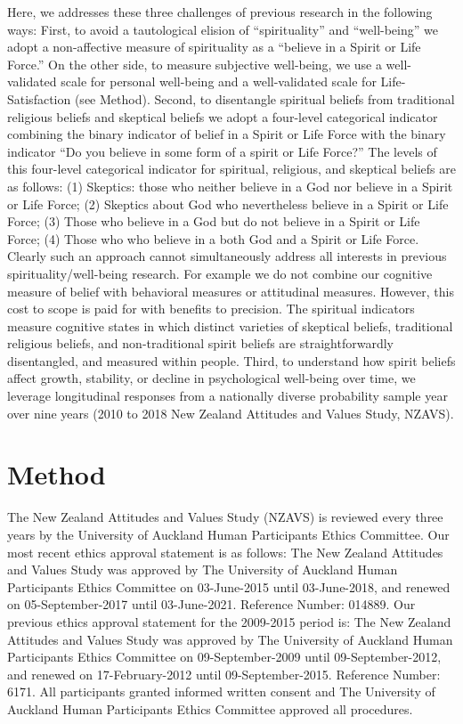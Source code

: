 \documentclass[
  english,
  man,floatsintext]{apa6}
\begin{document}
Here, we addresses these three challenges of previous research in the following ways: First, to avoid a tautological elision of \enquote{spirituality} and \enquote{well-being} we adopt a non-affective measure of spirituality as a \enquote{believe in a Spirit or Life Force.} On the other side, to measure subjective well-being, we use a well-validated scale for personal well-being and a well-validated scale for Life-Satisfaction (see Method). Second, to disentangle spiritual beliefs from traditional religious beliefs and skeptical beliefs we adopt a four-level categorical indicator combining the binary indicator of belief in a Spirit or Life Force with the binary indicator \enquote{Do you believe in some form of a spirit or Life Force?} The levels of this four-level categorical indicator for spiritual, religious, and skeptical beliefs are as follows: (1) Skeptics: those who neither believe in a God nor believe in a Spirit or Life Force; (2) Skeptics about God who nevertheless believe in a Spirit or Life Force; (3) Those who believe in a God but do not believe in a Spirit or Life Force; (4) Those who who believe in a both God and a Spirit or Life Force. Clearly such an approach cannot simultaneously address all interests in previous spirituality/well-being research. For example we do not combine our cognitive measure of belief with behavioral measures or attitudinal measures. However, this cost to scope is paid for with benefits to precision. The spiritual indicators measure cognitive states in which distinct varieties of skeptical beliefs, traditional religious beliefs, and non-traditional spirit beliefs are straightforwardly disentangled, and measured within people. Third, to understand how spirit beliefs affect growth, stability, or decline in psychological well-being over time, we leverage longitudinal responses from a nationally diverse probability sample year over nine years (2010 to 2018 New Zealand Attitudes and Values Study, NZAVS).

\hypertarget{method}{%
\section{Method}\label{method}}

The New Zealand Attitudes and Values Study (NZAVS) is reviewed every three years by the University of Auckland Human Participants Ethics Committee. Our most recent ethics approval statement is as follows: The New Zealand Attitudes and Values Study was approved by The University of Auckland Human Participants Ethics Committee on 03-June-2015 until 03-June-2018, and renewed on 05-September-2017 until 03-June-2021. Reference Number: 014889. Our previous ethics approval statement for the 2009-2015 period is: The New Zealand Attitudes and Values Study was approved by The University of Auckland Human Participants Ethics Committee on 09-September-2009 until 09-September-2012, and renewed on 17-February-2012 until 09-September-2015. Reference Number: 6171. All participants granted informed written consent and The University of Auckland Human Participants Ethics Committee approved all procedures.
\end{document}
